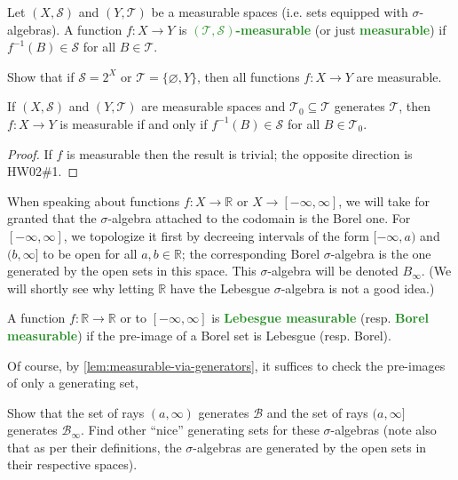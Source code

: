 \documentclass[11pt]{scrartcl}
\providecommand{\RR}{\mathbb R}
\providecommand{\inv}{^{-1}}
\providecommand{\vocab}[1]{{\textbf{\textcolor{ForestGreen}{#1}}}}
\begin{document}
\begin{definition}
    \label{def:measurable-function}
    Let $(X,\mathcal S)$ and $(Y,\mathcal T)$ be a measurable spaces
    (i.e. sets equipped with $\sigma$-algebras).
    A function $f\colon X\to Y$ is \vocab{$(\mathcal T,\mathcal S)$-measurable}
    (or just \vocab{measurable}) if $f\inv(B)\in\mathcal S$
    for all $B\in\mathcal T$.
\end{definition}

\begin{exercise}
    Show that if $\mathcal S = 2^X$ or $\mathcal T = \{\varnothing,Y\}$,
    then all functions $f\colon X\to Y$ are measurable.
\end{exercise}

\begin{lemma}
    \label{lem:measurable-via-generators}
    If $(X,\mathcal S)$ and $(Y,\mathcal T)$ are measurable spaces
    and $\mathcal T_0\subseteq\mathcal T$ generates $\mathcal T$,
    then $f\colon X\to Y$ is measurable if and only if
    $f\inv(B)\in\mathcal S$ for all $B\in\mathcal T_0$.
\end{lemma}

\begin{proof}
    If $f$ is measurable then the result is trivial;
    the opposite direction is HW02\#1.
\end{proof}

When speaking about functions $f\colon X\to\RR$ or $X\to[-\infty,\infty]$,
we will take for granted that the $\sigma$-algebra attached to the codomain
is the Borel one. For $[-\infty,\infty]$, we topologize it first by
decreeing intervals of the form $[-\infty, a)$ and $(b,\infty]$
to be open for all $a,b\in\RR$; the corresponding Borel $\sigma$-algebra
is the one generated by the open sets in this space. This $\sigma$-algebra
will be denoted $B_\infty$.
(We will shortly see why letting $\RR$ have the Lebesgue $\sigma$-algebra
is not a good idea.)

\begin{definition}
    \label{def:lebesgue-borel-meas-function}
    A function $f\colon\RR\to\RR$ or to $[-\infty,\infty]$
    is \vocab{Lebesgue measurable} (resp. \vocab{Borel measurable})
    if the pre-image of a Borel set is Lebesgue (resp. Borel).
\end{definition}

Of course, by \autoref{lem:measurable-via-generators},
it suffices to check the pre-images of only a generating set,
\begin{exercise}
    Show that the set of rays $(a,\infty)$ generates $\mathcal B$
    and the set of rays $(a,\infty]$ generates $\mathcal B_\infty$.
    Find other ``nice'' generating sets for these $\sigma$-algebras
    (note also that as per their definitions, the $\sigma$-algebras
    are generated by the open sets in their respective spaces).
\end{exercise}
\end{document}
